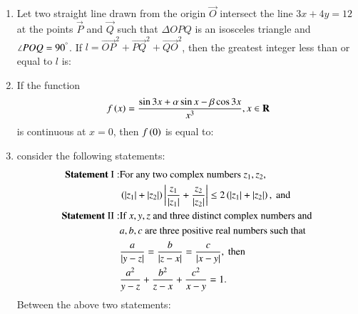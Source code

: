\documentclass[journal]{IEEEtran}
\numberwithin{equation}{enumi}
\numberwithin{figure}{enumi}
\begin{document}
\begin{enumerate}
    \item 
    Let two straight line drawn from the origin $\vec{O}$ intersect the line $3x + 4y = 12$ at the points $\vec{P}$ and $\vec{Q}$ such that $\Delta OPQ$ is an isosceles triangle and $\angle POQ = 90^{\degree}$. If $l = \vec{OP}^2 + \vec{PQ}^2 + \vec{QO}^2$, then the greatest integer less than or equal to $l$ is:

    \hfill{}

    \begin{enumerate}
    \end{enumerate}

    \item 
    If the function 
    \begin{align*}
        f\left(x\right) = \frac{\sin{3x} + \alpha\sin{x} - \beta\cos{3x}}{x^3}, x \in \mathbf{R}
    \end{align*}
    is continuous at $x = 0$, then $f\left(0\right)$ is equal to:

    \hfill{}

    \begin{enumerate}
    \end{enumerate}

    \item 
    consider the following statements: 
    \begin{align*}
        \textbf{Statement }\mathrm{I:} & \text{For any two complex numbers } z_1, z_2, \\
        & \left(\left\vert z_1\right\vert + \left\vert z_2\right\vert\right)\left\vert\frac{z_1}{\left\vert z_1\right\vert} + \frac{z_2}{\left\vert z_2\right\vert}\right\vert \leq 2\left(\left\vert z_1\right\vert + \left\vert z_2\right\vert\right), \text{ and }\\
        \textbf{Statement }\mathrm{II:} & \text{If } x, y, z \text{ and three distinct complex numbers and } \\
        & a, b, c \text{ are three positive real numbers such that } \\
        & \frac{a}{\left\vert y - z\right\vert} = \frac{b}{\left\vert z - x\right\vert} = \frac{c}{\left\vert x - y\right\vert}, \text{ then} \\
        & \frac{a^2}{y - z} + \frac{b^2}{z - x} + \frac{c^2}{x - y} = 1.
    \end{align*}
    Between the above two statements: 


\end{enumerate}
\end{document}
